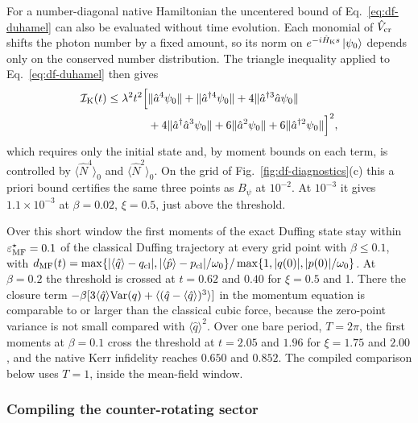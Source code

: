 \documentclass[pra,twocolumn,superscriptaddress,nofootinbib,floatfix]{revtex4-2}
\theoremstyle{remark}
\begin{document}
For a number-diagonal native Hamiltonian the uncentered bound of Eq.~\eqref{eq:df-duhamel} can also be evaluated without time evolution. Each monomial of \(\hat V_{\rm cr}\) shifts the photon number by a fixed amount, so its norm on \(e^{-i\hat H_{\rm K}s}\ket{\psi_0}\) depends only on the conserved number distribution. The triangle inequality applied to Eq.~\eqref{eq:df-duhamel} then gives
\begin{align}
\mathcal I_{\rm K}(t)\le\lambda^2t^2\Big[&\|\hat a^4\psi_0\|+\|\hat a^{\dagger4}\psi_0\|+4\|\hat a^{\dagger3}\hat a\psi_0\|\nonumber\\
&+4\|\hat a^\dagger\hat a^3\psi_0\|+6\|\hat a^2\psi_0\|+6\|\hat a^{\dagger2}\psi_0\|\Big]^2 ,
\label{eq:df-apriori}
\end{align}
which requires only the initial state and, by moment bounds on each term, is controlled by \(\langle\hat N^4\rangle_0\) and \(\langle\hat N^2\rangle_0\). On the grid of Fig.~\ref{fig:df-diagnostics}(c) this a priori bound certifies the same three points as \(B_\psi\) at \(10^{-2}\). At \(10^{-3}\) it gives \(1.1\times10^{-3}\) at \(\beta=0.02\), \(\xi=0.5\), just above the threshold.

Over this short window the first moments of the exact Duffing state stay within \(\varepsilon^\star_{\rm MF}=0.1\) of the classical Duffing trajectory at every grid point with \(\beta\le0.1\), with \(d_{\rm MF}(t)=\max\{|\langle\hat q\rangle-q_{\rm cl}|,|\langle\hat p\rangle-p_{\rm cl}|/\omega_0\}/\max\{1,|q(0)|,|p(0)|/\omega_0\}\). At \(\beta=0.2\) the threshold is crossed at \(t=0.62\) and \(0.40\) for \(\xi=0.5\) and 1. There the closure term \(-\beta[3\langle\hat q\rangle{\rm Var}(q)+\langle(\hat q-\langle\hat q\rangle)^3\rangle]\) in the momentum equation is comparable to or larger than the classical cubic force, because the zero-point variance is not small compared with \(\langle\hat q\rangle^2\). Over one bare period, \(T=2\pi\), the first moments at \(\beta=0.1\) cross the threshold at \(t=2.05\) and \(1.96\) for \(\xi=1.75\) and \(2.00\), and the native Kerr infidelity reaches \(0.650\) and \(0.852\). The compiled comparison below uses \(T=1\), inside the mean-field window.

\subsubsection{Compiling the counter-rotating sector}
\label{subsec:df-compile}
\end{document}
